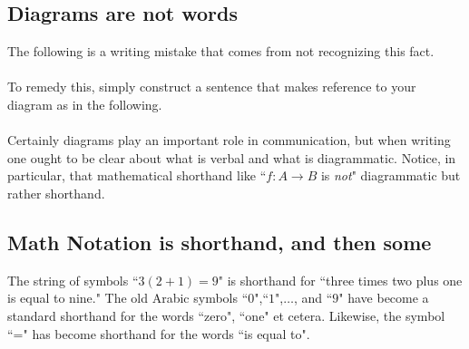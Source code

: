 \documentclass[12pt]{article}
\def\noi{\noindent}
\def\thup{\rightthumbsup}
\def\thdn{\rightthumbsdown}
\begin{document}
\subsection{Diagrams are not words}
The following is a writing mistake that comes from not recognizing this fact.\\

 \thdn \\

\noi To remedy this, simply construct a sentence that makes reference to your diagram as in the following.\\

 \thup\\

Certainly diagrams play an important  role in communication, but when writing one ought to be clear about what is verbal and what is diagrammatic. Notice, in particular, that mathematical shorthand like ``$f:A\to B$ is {\it not}" diagrammatic but rather shorthand. 


\subsection{Math Notation is shorthand, and then some}

The string of symbols ``$3(2+1)=9$" is shorthand for ``three times two plus one is equal to nine." The old Arabic symbols ``$0$",``$1$",$\dots$,%
and ``$9$"  have become a standard shorthand for the words ``zero", ``one" et cetera. Likewise, the symbol ``=" has become shorthand for the words ``is equal to". \\
\end{document}
